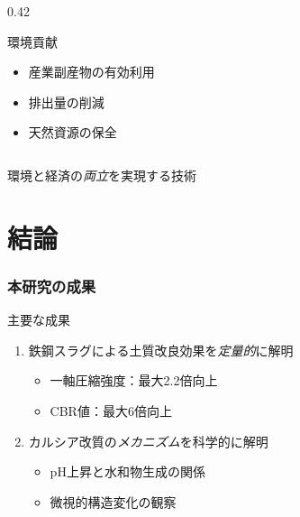 \documentclass[unicode, 9pt, aspectratio=43]{beamer}
\begin{document}
\begin{refsection}
\begin{frame}
\begin{columns}
\begin{column}{0.42\linewidth}
\begin{exampleblock}{環境貢献}
          \vspace{1em}
          \normalsize
          \begin{itemize}
            \item 産業副産物の有効利用
            \item {}排出量の削減
            \item 天然資源の保全
          \end{itemize}
        \end{exampleblock}
      \end{column}
    \end{columns}

    \vspace{0.5em}
    \centering
    \begin{minipage}{0.65\linewidth}
      \begin{roundbox}[green!25]{\linewidth}
        \centering
        \small
        環境と経済の\emph{両立}を実現する技術
      \end{roundbox}
    \end{minipage}
  \end{frame}

  \section{結論}

  \begin{frame}
    \frametitle{本研究の成果}
    \begin{center}
      \begin{minipage}{0.85\linewidth}
        \begin{block}{主要な成果}
          \begin{enumerate}
            \item 鉄鋼スラグによる土質改良効果を\emph{定量的}に解明
              \begin{itemize}
                \item 一軸圧縮強度：最大2.2倍向上
                \item CBR値：最大6倍向上
              \end{itemize}

            \item カルシア改質の\emph{メカニズム}を科学的に解明
              \begin{itemize}
                \item pH上昇と水和物生成の関係
                \item 微視的構造変化の観察
              \end{itemize}


\end{enumerate}
\end{block}
\end{minipage}
\end{center}
\end{frame}
\end{refsection}
\end{document}
